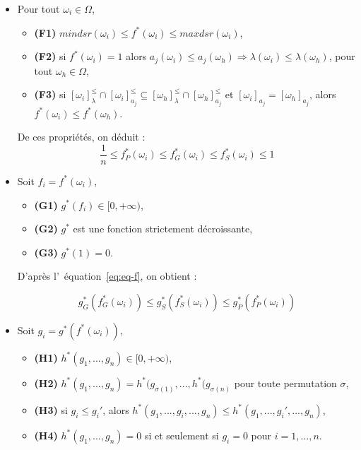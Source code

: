 \documentclass[a4paper]{article}
\renewcommand{\eqref}[1]{équation~\ref{#1}}
\begin{document}
\begin{itemize}
    \item Pour tout $\omega_i \in \Omega$,
    \begin{itemize}
        \item \textbf{(F1)} $mindsr(\omega_i) \leq f^*(\omega_i) \leq maxdsr(\omega_i)$,
        \item \textbf{(F2)} si $f^*(\omega_i) = 1$ alors $a_j(\omega_i) \leq a_j(\omega_h)
            \Rightarrow \lambda(\omega_i) \leq \lambda(\omega_h)$, pour tout
            $\omega_h \in \Omega$,
        \item \textbf{(F3)} si $[\omega_i]^{\leq}_{\lambda} \cap [\omega_i]^{\leq}_{a_j} \subseteq
        [\omega_h]^{\leq}_{\lambda} \cap [\omega_h]^{\leq}_{a_j}$ et
        $[\omega_i]_{a_j} = [\omega_h]_{a_j}$, alors $f^*(\omega_i) \leq
        f^*(\omega_h)$. 
    \end{itemize}
    
    De ces propriétés, on déduit : 
    \begin{equation}
        \frac{1}{n} \leq f^*_P(\omega_i) \leq f^*_G(\omega_i) \leq f^*_S(\omega_i)
        \leq 1 
    \label{eq:eq-f}
    \end{equation}

    \item Soit $f_i = f^*(\omega_i)$,
    \begin{itemize}
        \item \textbf{(G1)} $g^*(f_i) \in [0, +\infty)$,
        \item \textbf{(G2)} $g^*$ est une fonction strictement décroissante,
        \item \textbf{(G3)} $g^*(1) = 0$.
    \end{itemize}

    D'après l'~\eqref{eq:eq-f}, on obtient :

    \begin{equation}
        g^*_G(f^*_G(\omega_i)) \leq g^*_S(f^*_S(\omega_i)) \leq
        g^*_P(f^*_P(\omega_i))
    \label{eq:eq-g}
    \end{equation}

    \item Soit $g_i = g^*(f^*(\omega_i))$,
    \begin{itemize}
        \item \textbf{(H1)} $h^*(g_1,...,g_n) \in [0, +\infty)$,
        \item \textbf{(H2)} $h^*(g_1,...,g_n) = h^*(g_{\sigma
            (1)},...,h^*(g_{\sigma (n)}$ pour toute permutation $\sigma$,
        \item \textbf{(H3)} si $g_i \leq g_i'$, alors $h^*(g_1,...,g_i,...,g_n)
            \leq h^*(g_1,...,g_i',...,g_n)$, 
        \item \textbf{(H4)} $h^*(g_1,...,g_n) = 0$ si et seulement si $g_i = 0$
            pour $i=1,...,n$.\\
    \end{itemize}
\end{itemize}
\end{document}
